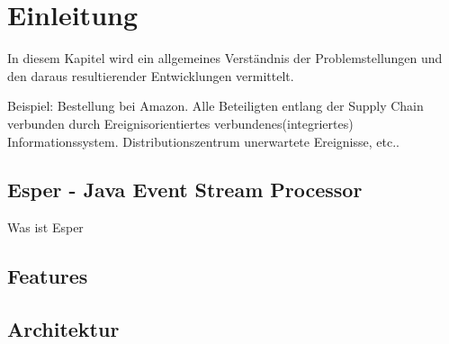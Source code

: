 \chapter{Einleitung}

In diesem Kapitel wird ein allgemeines Verständnis der Problemstellungen und den daraus resultierender Entwicklungen vermittelt.

Beispiel: Bestellung bei Amazon. Alle Beteiligten entlang der Supply Chain verbunden durch Ereignisorientiertes verbundenes(integriertes) Informationssystem. Distributionszentrum unerwartete Ereignisse, etc..


\section{Esper - Java Event Stream Processor}

Was ist Esper

\section{Features}

\section{Architektur}